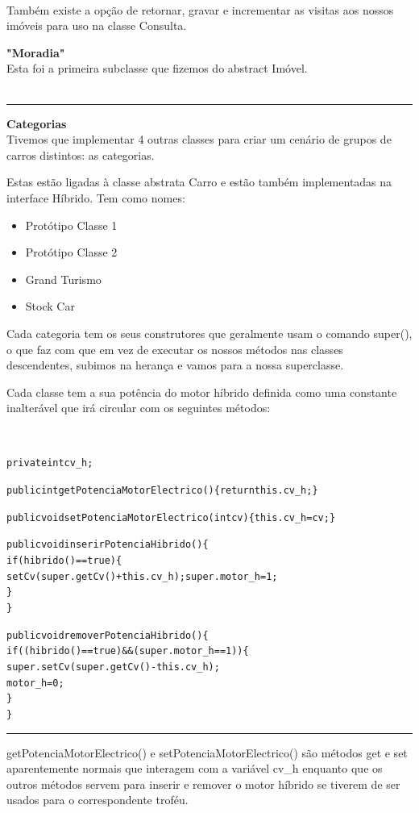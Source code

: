 \documentclass[10pt]{article}
\newenvironment{code}                    
{\textbf{
} \hspace{1cm} \hrulefill \\ 
\smallskip 
\begin{center}
\begin{minipage}{0.9\textwidth} 
\begin{alltt}\small}
{\end{alltt}
\end{minipage}
\end{center}
\hrule\smallskip
}
\begin{document}
\\
Também existe a opção de retornar, gravar e incrementar as visitas aos nossos imóveis para uso na classe Consulta.

\pagebreak

\textbf{"Moradia"}
\\
Esta foi a primeira subclasse que fizemos do abstract Imóvel.  
\\

\begin{code}
\end{code}


\pagebreak
\textbf{Categorias}
\\
Tivemos que implementar 4 outras classes para criar um cenário de grupos de carros distintos: as categorias. 

Estas estão ligadas à classe abstrata Carro e estão também implementadas na interface Híbrido. Tem como nomes:

\begin{itemize}
\item Protótipo Classe 1
\item Protótipo Classe 2
\item Grand Turismo 
\item Stock Car
\end{itemize}

Cada categoria tem os seus construtores que geralmente usam o comando super(), o que faz com que em vez de executar os nossos métodos nas classes descendentes, subimos na herança e vamos para a nossa superclasse.

Cada classe tem a sua potência do motor híbrido definida como uma constante inalterável que irá circular com os seguintes métodos:

\begin{code}
  private int cv_h;
  
  
  public int getPotenciaMotorElectrico()\{return this.cv_h;\}
    
    public void setPotenciaMotorElectrico(int cv)\{this.cv_h=cv;\}
    
    public void inserirPotenciaHibrido()\{
        if (hibrido()==true)\{
            setCv(super.getCv() + this.cv_h);super.motor_h=1;
        \}
    \}
    
    public void removerPotenciaHibrido()\{
        if ((hibrido()==true)&&(super.motor_h==1))\{
            super.setCv(super.getCv() - this.cv_h);
            motor_h=0;
        \}
    \}

\end{code}
getPotenciaMotorElectrico() e setPotenciaMotorElectrico() são métodos get e set aparentemente normais que interagem com a variável cv\_h enquanto que os outros métodos servem para inserir e remover o motor híbrido se tiverem de ser usados para o correspondente troféu.
\end{document}
